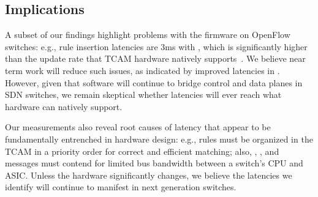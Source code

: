 \subsection{Implications}


A subset of our findings highlight 
problems with the firm\-ware on OpenFlow switches:
e.g., rule insertion latencies are 3ms with \BroadcomOne, which is significantly higher than the 
update rate that TCAM hardware natively supports~\cite{estan:private}. 
We believe near term work will reduce such issues, as indicated by
improved latencies in \BroadcomThree. 
However, given that software will continue to bridge 
control and data planes in SDN switches, we remain skeptical whether 
latencies will ever reach what hardware can natively support.


Our measurements also reveal root causes of latency that appear to be
fundamentally entrenched in hardware design: e.g., rules 
must be organized in the TCAM in a priority order for correct and efficient matching; 
also, \packetin, \flowmod, and \packetout messages must contend for limited
bus bandwidth between a switch's CPU and ASIC. Unless the hardware
significantly changes, we believe the latencies we identify
will continue to manifest in next generation switches.  


